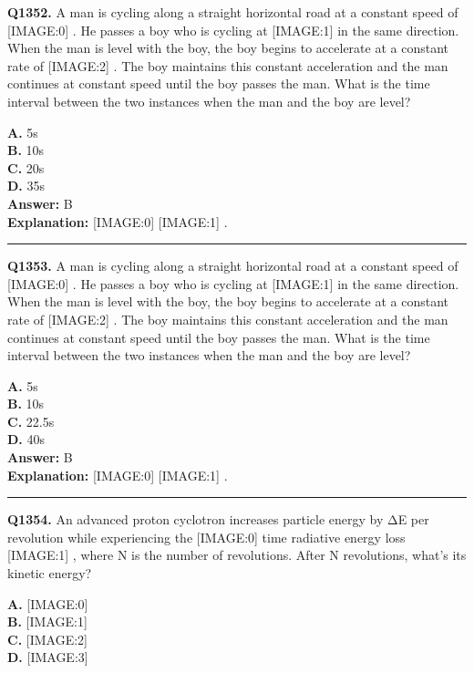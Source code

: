 \documentclass[12pt]{article}
\begin{document}
\noindent
\textbf{Q1352.} A man is cycling along a straight horizontal road at a constant speed of
[IMAGE:0]
. He passes a boy who is cycling at
[IMAGE:1]
in the same direction. When the man is level with the boy, the boy begins to accelerate at a constant rate of
[IMAGE:2]
. The boy maintains this constant acceleration and the man continues at constant speed until the boy passes the man. What is the time interval between the two instances when the man and the boy are level?



\textbf{A.} 5s \\
\textbf{B.} 10s \\
\textbf{C.} 20s \\
\textbf{D.} 35s \\

\textbf{Answer:} B \\
\textbf{Explanation:} [IMAGE:0]
[IMAGE:1]
.

\hrule
\vspace{1em}


\noindent
\textbf{Q1353.} A man is cycling along a straight horizontal road at a constant speed of
[IMAGE:0]
. He passes a boy who is cycling at
[IMAGE:1]
in the same direction. When the man is level with the boy, the boy begins to accelerate at a constant rate of
[IMAGE:2]
. The boy maintains this constant acceleration and the man continues at constant speed until the boy passes the man. What is the time interval between the two instances when the man and the boy are level?



\textbf{A.} 5s \\
\textbf{B.} 10s \\
\textbf{C.} 22.5s \\
\textbf{D.} 40s \\

\textbf{Answer:} B \\
\textbf{Explanation:} [IMAGE:0]
[IMAGE:1]
.

\hrule
\vspace{1em}


\noindent
\textbf{Q1354.} An advanced proton cyclotron increases particle energy by ΔE per revolution while experiencing the
[IMAGE:0]
time radiative energy loss
[IMAGE:1]
, where N is the number of revolutions. After N revolutions, what's its kinetic energy?



\textbf{A.} [IMAGE:0] \\
\textbf{B.} [IMAGE:1] \\
\textbf{C.} [IMAGE:2] \\
\textbf{D.} [IMAGE:3] \\
\end{document}
